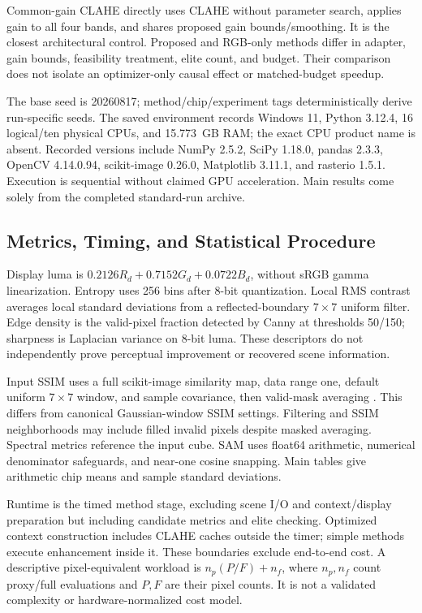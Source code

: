 \documentclass[conference]{IEEEtran}
\begin{document}
Common-gain CLAHE directly uses CLAHE without parameter search, applies gain to all four bands, and shares proposed gain bounds/smoothing. It is the closest architectural control. Proposed and RGB-only methods differ in adapter, gain bounds, feasibility treatment, elite count, and budget. Their comparison does not isolate an optimizer-only causal effect or matched-budget speedup.

The base seed is 20260817; method/chip/experiment tags deterministically derive run-specific seeds. The saved environment records Windows 11, Python 3.12.4, 16 logical/ten physical CPUs, and 15.773~GB RAM; the exact CPU product name is absent. Recorded versions include NumPy 2.5.2, SciPy 1.18.0, pandas 2.3.3, OpenCV 4.14.0.94, scikit-image 0.26.0, Matplotlib 3.11.1, and rasterio 1.5.1. Execution is sequential without claimed GPU acceleration. Main results come solely from the completed standard-run archive.

\subsection{Metrics, Timing, and Statistical Procedure}
Display luma is $0.2126R_d+0.7152G_d+0.0722B_d$, without sRGB gamma linearization. Entropy uses 256 bins after 8-bit quantization. Local RMS contrast averages local standard deviations from a reflected-boundary $7\times7$ uniform filter. Edge density is the valid-pixel fraction detected by Canny at thresholds 50/150; sharpness is Laplacian variance on 8-bit luma. These descriptors do not independently prove perceptual improvement or recovered scene information.

Input SSIM uses a full scikit-image similarity map, data range one, default uniform $7\times7$ window, and sample covariance, then valid-mask averaging \cite{wang2004,skimageDocs}. This differs from canonical Gaussian-window SSIM settings. Filtering and SSIM neighborhoods may include filled invalid pixels despite masked averaging. Spectral metrics reference the input cube. SAM uses float64 arithmetic, numerical denominator safeguards, and near-one cosine snapping. Main tables give arithmetic chip means and sample standard deviations.

Runtime is the timed method stage, excluding scene I/O and context/display preparation but including candidate metrics and elite checking. Optimized context construction includes CLAHE caches outside the timer; simple methods execute enhancement inside it. These boundaries exclude end-to-end cost. A descriptive pixel-equivalent workload is $n_p(P/F)+n_f$, where $n_p,n_f$ count proxy/full evaluations and $P,F$ are their pixel counts. It is not a validated complexity or hardware-normalized cost model.
\end{document}
